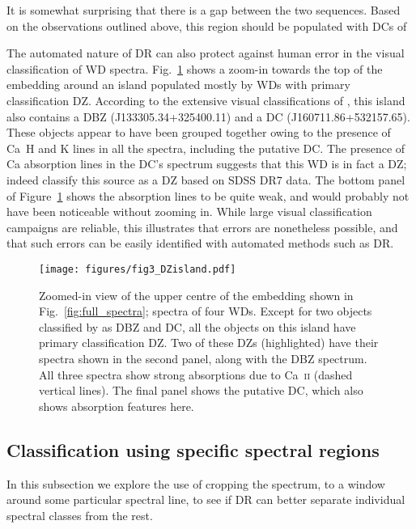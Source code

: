 \documentclass[fleqn,usenatbib]{mnras}
\begin{document}
It is somewhat surprising that there is a gap between the two sequences.
Based on the observations outlined above, this region should be populated with DCs of 

The automated nature of DR can also protect against human error in the visual classification of WD spectra.
Fig.~\ref{fig:DZisland} shows a zoom-in towards the top of the embedding around an island populated mostly by WDs with primary classification DZ.
According to the extensive visual classifications of \citet{manser24}, this island also contains a DBZ (J133305.34+325400.11) and a DC (J160711.86+532157.65).
These objects appear to have been grouped together owing to the presence of Ca~H and K lines in all the spectra, including the putative DC.
The presence of Ca absorption lines in the DC's spectrum suggests that this WD is in fact a DZ; indeed \citet{kleinman13} classify this source as a DZ based on SDSS DR7 data.
The bottom panel of Figure~\ref{fig:DZisland} shows the absorption lines to be quite weak, and would probably not have been noticeable without zooming in.
While large visual classification campaigns are reliable, this illustrates that errors are nonetheless possible, and that such errors can be easily identified with automated methods such as DR.

\begin{figure}
\texttt{[image: figures/fig3\_DZisland.pdf]}
\caption{
    Zoomed-in view of the upper centre of the embedding shown in Fig.~\ref{fig:full_spectra}; spectra of four WDs.
    Except for two objects classified by \citet{manser24} as DBZ and DC, all the objects on this island have primary classification DZ.
    Two of these DZs (highlighted) have their spectra shown in the second panel, along with the DBZ spectrum.
    All three spectra show strong absorptions due to Ca~\textsc{ii} (dashed vertical lines).
    The final panel shows the putative DC, which also shows absorption features here.
}
\label{fig:DZisland}
\end{figure}

\subsection{Classification using specific spectral regions}
\label{sec:zoom}

In this subsection we explore the use of cropping the spectrum, to a window around some particular spectral line, to see if DR can better separate individual spectral classes from the rest.
\end{document}
